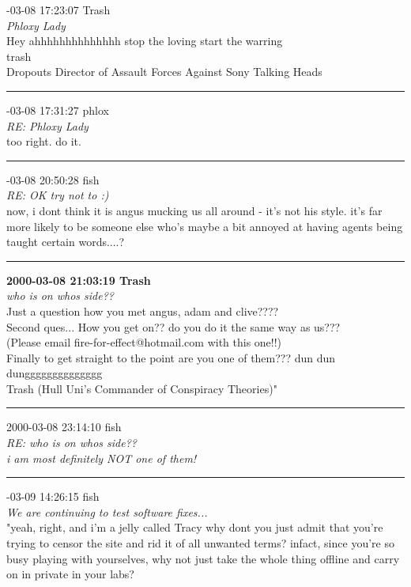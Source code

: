 \begin{mail}

{-03-08 17:23:07 Trash}\\
{\itshape Phloxy Lady}\\
Hey ahhhhhhhhhhhhhh stop the loving start the warring\\
trash\\
Dropouts Director of Assault Forces Against Sony Talking Heads\\

\rule{0.8\textwidth}{.4pt}

{-03-08 17:31:27 phlox}\\
{\itshape RE: Phloxy Lady}\\
too right. do it.\\


\rule{0.8\textwidth}{.4pt}


{-03-08 20:50:28 fish}\\
{\itshape RE: OK try not to :)}\\
now, i dont think it is angus mucking us all around - it's not his style. it's far more likely to be someone 
else who's maybe a bit annoyed at having agents being taught certain words....?	\\

\rule{0.8\textwidth}{.4pt}

{\bf2000-03-08 21:03:19	Trash}	\\
{\itshape who is on whos side??}\\
Just a question how you met angus, adam and clive????\\
Second ques... How you get on?? do you do it the same way as us??? \\
(Please email fire-for-effect@hotmail.com with this one!!)\\
Finally to get straight to the point are you one of them??? dun dun dungggggggggggggg \\
Trash (Hull Uni's Commander of Conspiracy Theories)"	\\

\rule{0.8\textwidth}{.4pt}

{2000-03-08 23:14:10 fish}\\
{\itshape RE: who is on whos side??}\\
{\itshape i am most definitely NOT one of them!}\\

\rule{0.8\textwidth}{.4pt}

{-03-09 14:26:15 fish}\\
{\itshape We are continuing to test software fixes...}\\
"yeah, right, and i'm a jelly called Tracy
why dont you just admit that you're trying to censor the site and rid it of all unwanted terms? infact, since you're so busy playing with yourselves, why not just take the whole thing offline and carry on in private in your labs?	\\


\end{mail}
